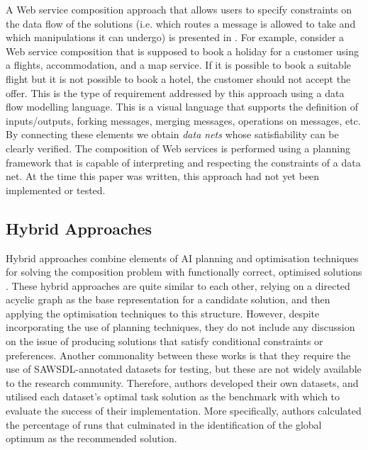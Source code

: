 A Web service composition approach that allows users to specify constraints on the data flow of the solutions (i.e. which routes a message is allowed to take and which manipulations it can undergo) is presented in \cite{marconi2006specifying}. For example, consider a Web service composition that is supposed to book a holiday for a customer using a flights, accommodation, and a map service. If it is possible to book a suitable flight but it is not possible to book a hotel, the customer should not accept the offer. This is the type of requirement addressed by this approach using a data flow modelling language. This is a visual language that supports the definition of inputs/outputs, forking messages, merging messages, operations on messages, etc. By connecting these elements we obtain \textit{data nets} whose satisfiability can be clearly verified. The composition of Web services is performed using a planning framework that is capable of interpreting and respecting the constraints of a data net. At the time this paper was written, this approach had not yet been implemented or tested.

\subsection{Hybrid Approaches}

Hybrid approaches combine elements of AI planning and optimisation techniques for solving the composition problem with functionally correct, optimised solutions \cite{cotta2007memetic,pop2011tabu,xiang2011qos,chifu2012optimizing}. These hybrid approaches are quite similar to each other, relying on a directed acyclic graph as the base representation for a candidate solution, and then applying the optimisation techniques to this structure. However, despite incorporating the use of planning techniques, they do not include any discussion on the issue of producing solutions that satisfy conditional constraints or preferences. Another commonality between these works is that they require the use of SAWSDL-annotated datasets for testing, but these are not widely available to the research community. Therefore, authors developed their own datasets, and utilised each dataset's optimal task solution as the benchmark with which to evaluate the success of their implementation. More specifically, authors calculated the percentage of runs that culminated in the identification of the global optimum  as the recommended solution.

